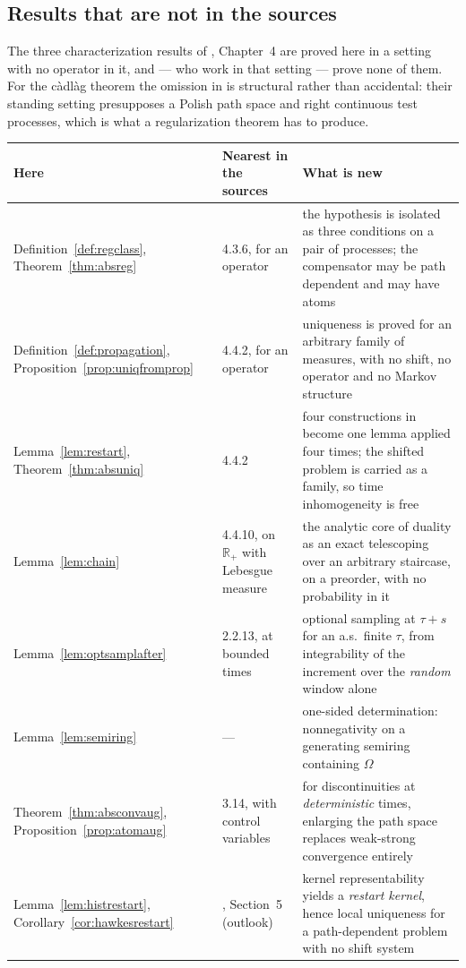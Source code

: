 \documentclass[11pt,a4paper]{article}
\theoremstyle{plain}
\theoremstyle{definition}
\theoremstyle{remark}
\newcommand{\R}{\mathbb{R}}
\newcommand{\Rp}{\R_+}
\newcommand{\DGP}{\cite{DGP24}}
\newcommand{\EK}{\cite{EK86}}
\newcommand{\CPS}{\cite{CPS23}}
\begin{document}
\subsection{Results that are not in the sources}
\label{ssec:addednew}

The three characterization results of \EK, Chapter~4 are proved here in a
setting with no operator in it, and \CPS{} --- who work in that setting --- prove
none of them.  For the c\`adl\`ag theorem the omission in \CPS{} is structural
rather than accidental: their standing setting presupposes a Polish path space
and right continuous test processes, which is what a regularization theorem has
to produce.

\medskip
\noindent
\begin{tabular}{@{}p{}p{}p{}@{}}
\toprule
\textbf{Here} & \textbf{Nearest in the sources} & \textbf{What is new} \\
\midrule
Definition~\ref{def:regclass}, Theorem~\ref{thm:absreg}
  & \EK{} 4.3.6, for an operator
  & the hypothesis is isolated as three conditions on a pair of processes; the
    compensator may be path dependent and may have atoms \\
Definition~\ref{def:propagation}, Proposition~\ref{prop:uniqfromprop}
  & \EK{} 4.4.2, for an operator
  & uniqueness is proved for an arbitrary family of measures, with no shift, no
    operator and no Markov structure \\
Lemma~\ref{lem:restart}, Theorem~\ref{thm:absuniq}
  & \EK{} 4.4.2
  & four constructions in \EK{} become one lemma applied four times; the shifted
    problem is carried as a family, so time inhomogeneity is free \\
Lemma~\ref{lem:chain}
  & \EK{} 4.4.10, on $\Rp$ with Lebesgue measure
  & the analytic core of duality as an exact telescoping over an arbitrary
    staircase, on a preorder, with no probability in it \\
Lemma~\ref{lem:optsamplafter}
  & \EK{} 2.2.13, at bounded times
  & optional sampling at $\tau+s$ for an a.s.\ finite $\tau$, from
    integrability of the increment over the \emph{random} window alone \\
Lemma~\ref{lem:semiring}
  & ---
  & one-sided determination: nonnegativity on a generating semiring containing
    $\Omega$ \\
Theorem~\ref{thm:absconvaug}, Proposition~\ref{prop:atomaug}
  & \CPS{} 3.14, with control variables
  & for discontinuities at \emph{deterministic} times, enlarging the path space
    replaces weak-strong convergence entirely \\
Lemma~\ref{lem:histrestart}, Corollary~\ref{cor:hawkesrestart}
  & \DGP, Section~5 (outlook)
  & kernel representability yields a \emph{restart kernel}, hence local
    uniqueness for a path-dependent problem with no shift system \\
\bottomrule
\end{tabular}
\end{document}
